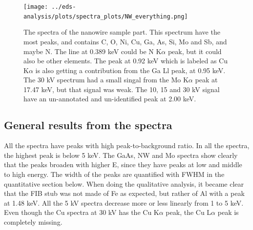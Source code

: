 \begin{figure}[h]
    \centering
    \texttt{[image: ../eds-analysis/plots/spectra\_plots/NW\_everything.png]}
    \caption{
        The spectra of the nanowire sample part.
        This spectrum have the most peaks, and contains  C, O, Ni, Cu, Ga, As, Si, Mo and Sb, and maybe N.
        The line at 0.389 keV could be N K$\alpha$ peak, but it could also be other elements. %
        The peak at 0.92 keV which is labeled as Cu K$\alpha$ is also getting a contribution from the Ga Ll peak, at 0.95 keV. %
        The 30 kV spectrum had a small singal from the Mo K$\alpha$ peak at 17.47 keV, but that signal was weak.
        The 10, 15 and 30 kV signal have an un-annotated and un-identified peak at 2.00 keV. %
    }
    \label{fig:results:Spectra_NW}
\end{figure}

%
%
%
%
%
%
%
%
%
%
%
%
%
%
%

\subsection{General results from the spectra}
\label{sec:results:qualitative:general}

All the spectra have peaks with high peak-to-background ratio. %
In all the spectra, the highest peak is below 5 keV. %
The GaAs, NW and Mo spectra show clearly that the peaks broaden with higher E, since they have peaks at low and middle to high energy. %
The width of the peaks are quantified with FWHM in the quantitative section below.
When doing the qualitative analysis, it became clear that the FIB stub was not made of Fe as expected, but rather of Al with a peak at 1.48 keV.
All the 5 kV spectra decrease more or less linearly from 1 to 5 keV. %
Even though the Cu spectra at 30 kV has the Cu K$\alpha$ peak, the Cu L$\alpha$ peak is completely missing. %

